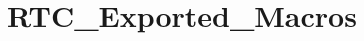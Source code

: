 \hypertarget{group___r_t_c___exported___macros}{}\section{R\+T\+C\+\_\+\+Exported\+\_\+\+Macros}
\label{group___r_t_c___exported___macros}
